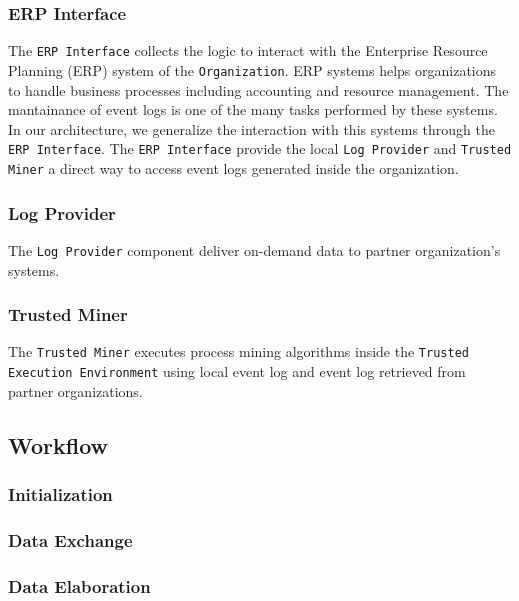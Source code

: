 \subsubsection{ERP Interface}
The \texttt{ERP Interface} collects the logic to interact with the Enterprise Resource Planning (ERP) system  of the \texttt{Organization}. ERP systems helps organizations to
handle business processes including accounting and resource management. The mantainance of event logs is one of the many tasks performed by these systems. In our architecture, we generalize the interaction with this systems through the \texttt{ERP Interface}. The \texttt{ERP Interface} provide the local \texttt{Log Provider} and \texttt{Trusted Miner} a direct way to access event logs generated inside the organization.

\subsubsection{Log Provider}
The \texttt{Log Provider} component deliver on-demand data to partner organization's systems.
\subsubsection{Trusted Miner}
 The \texttt{Trusted Miner} executes process mining algorithms inside the \texttt{Trusted Execution Environment} using local event log and event log retrieved from partner organizations.
\subsection{Workflow}
\subsubsection{Initialization}
\subsubsection{Data Exchange}
\subsubsection{Data Elaboration}




